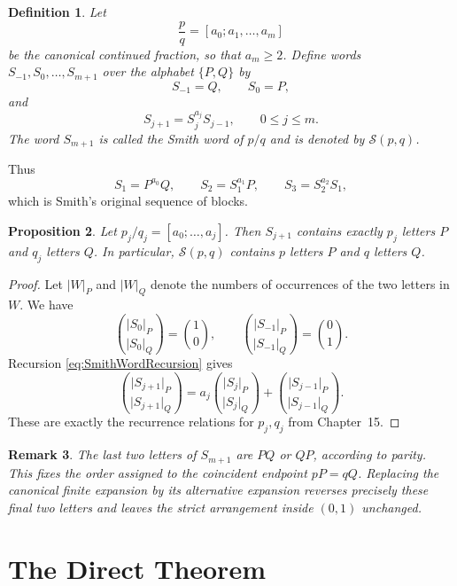 \documentclass{book}
\newtheorem{definition}{Definition}[section]
\newtheorem{proposition}[definition]{Proposition}
\newtheorem{remark}[definition]{Remark}
\begin{document}
\begin{definition}
  Let
  \[
    \frac pq=[a_0;a_1,\ldots,a_m]
  \]
  be the canonical continued fraction, so that \(a_m\geq2\). Define words
  \(S_{-1},S_0,\ldots,S_{m+1}\) over the alphabet \(\{P,Q\}\) by
  \[
    S_{-1}=Q,\qquad S_0=P,
  \]
  and
  \begin{equation}\label{eq:SmithWordRecursion}
    S_{j+1}=S_j^{a_j}S_{j-1},
    \qquad 0\leq j\leq m.
  \end{equation}
  The word \(S_{m+1}\) is called the \textnormal{Smith word} of \(p/q\) and
  is denoted by \(\mathcal S(p,q)\).
\end{definition}

Thus
\[
  S_1=P^{a_0}Q,\qquad
  S_2=S_1^{a_1}P,\qquad
  S_3=S_2^{a_2}S_1,
\]
which is Smith's original sequence of blocks.

\begin{proposition}\label{prop:SmithLetterCounts}
  Let \(p_j/q_j=[a_0;\ldots,a_j]\). Then \(S_{j+1}\) contains exactly
  \(p_j\) letters \(P\) and \(q_j\) letters \(Q\). In particular,
  \(\mathcal S(p,q)\) contains \(p\) letters \(P\) and \(q\) letters \(Q\).
\end{proposition}

\begin{proof}
  Let \(\lvert W\rvert_P\) and \(\lvert W\rvert_Q\) denote the numbers of
  occurrences of the two letters in \(W\). We have
  \[
    \binom{\lvert S_0\rvert_P}{\lvert S_0\rvert_Q}
      =\binom10,\qquad
    \binom{\lvert S_{-1}\rvert_P}{\lvert S_{-1}\rvert_Q}
      =\binom01.
  \]
  Recursion \eqref{eq:SmithWordRecursion} gives
  \[
    \binom{\lvert S_{j+1}\rvert_P}{\lvert S_{j+1}\rvert_Q}
    =
    a_j\binom{\lvert S_j\rvert_P}{\lvert S_j\rvert_Q}
      +\binom{\lvert S_{j-1}\rvert_P}{\lvert S_{j-1}\rvert_Q}.
  \]
  These are exactly the recurrence relations for \(p_j,q_j\) from
  Chapter~15.
\end{proof}

\begin{remark}
  The last two letters of \(S_{m+1}\) are \(PQ\) or \(QP\), according to
  parity. This fixes the order assigned to the coincident endpoint
  \(pP=qQ\). Replacing the canonical finite expansion by its alternative
  expansion reverses precisely these final two letters and leaves the strict
  arrangement inside \((0,1)\) unchanged.
\end{remark}

\section{The Direct Theorem}
\end{document}
